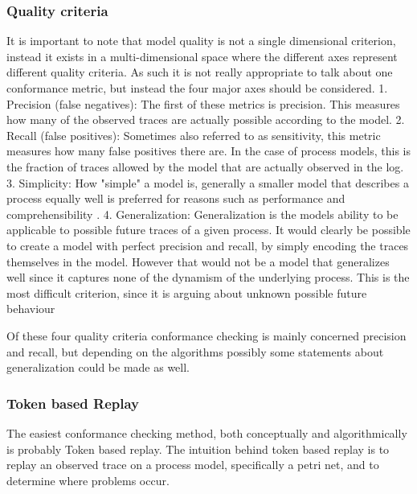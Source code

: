 \documentclass[runningheads]{template/llncs}
\begin{document}
\subsubsection{Quality criteria}
It is important to note that model quality is not a single dimensional criterion, instead it exists in a multi-dimensional space where the different axes represent different quality criteria.
As such it is not really appropriate to talk about one conformance metric, but instead the four major axes should be considered.
1. Precision (false negatives): The first of these metrics is precision. This measures how many of the observed traces are actually possible according to the model.
2. Recall (false positives): Sometimes also referred to as sensitivity, this metric measures how many false positives there are. In the case of process models, this is the fraction of traces allowed by the model that are actually observed in the log.
3. Simplicity: How "simple" a model is, generally a smaller model that describes a process equally well is preferred for reasons such as performance and comprehensibility .
4. Generalization: Generalization is the models ability to be applicable to possible future traces of a given process. 
It would clearly be possible to create a model with perfect precision and recall, by simply encoding the traces themselves in the model. However that would not be a model that generalizes well since it captures none of the dynamism of the underlying process. 
This is the most difficult criterion, since it is arguing about unknown possible future behaviour

Of these four quality criteria conformance checking is mainly concerned precision and recall, but depending on the algorithms possibly some statements about generalization could be made as well. 

\subsubsection{Token based Replay}

The easiest conformance checking method, both conceptually and algorithmically is probably Token based replay.
The intuition behind token based replay is to replay an observed trace on a process model, specifically a petri net, and to determine where problems occur.
\end{document}
